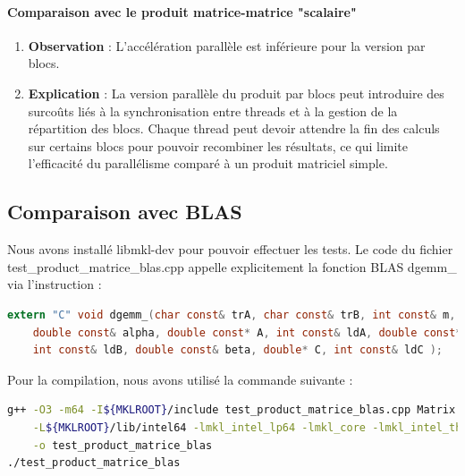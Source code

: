 \documentclass[a4paper,13pt]{book}
\begin{document}
\paragraph{Comparaison avec le produit matrice-matrice "scalaire"}
\begin{enumerate}
\item \textbf{ Observation} :
L'accélération parallèle est inférieure pour la version par blocs.
\item \textbf{Explication }:
La version parallèle du produit par blocs peut introduire des surcoûts liés à la synchronisation entre threads et à la gestion de la répartition des blocs. Chaque thread peut devoir attendre la fin des calculs sur certains blocs pour pouvoir recombiner les résultats, ce qui limite l’efficacité du parallélisme comparé à un produit matriciel simple.
\end{enumerate}

\subsection{Comparaison avec BLAS} 
Nous avons installé libmkl-dev pour pouvoir effectuer les tests. Le code du fichier test\_product\_matrice\_blas.cpp appelle explicitement la fonction BLAS dgemm\_ via l'instruction :
\begin{lstlisting}[language=C]
    extern "C" void dgemm_(char const& trA, char const& trB, int const& m, int const& n, int const& k,
    double const& alpha, double const* A, int const& ldA, double const* B,
    int const& ldB, double const& beta, double* C, int const& ldC );
\end{lstlisting}
Pour la compilation, nous avons utilisé la commande suivante :
\begin{lstlisting}[language=bash]
g++ -O3 -m64 -I${MKLROOT}/include test_product_matrice_blas.cpp Matrix.cpp \
    -L${MKLROOT}/lib/intel64 -lmkl_intel_lp64 -lmkl_core -lmkl_intel_thread -liomp5 -lpthread \
    -o test_product_matrice_blas
./test_product_matrice_blas
\end{lstlisting}
\end{document}
